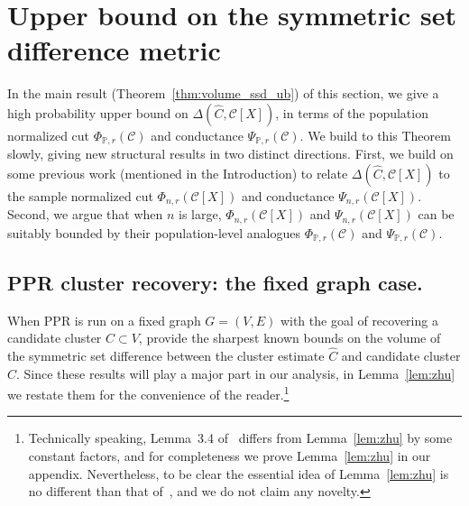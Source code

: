 \documentclass[11pt,twoside]{article}
\newcommand{\1}{\mathbf{1}}
\newcommand{\mc}[1]{\mathcal{#1}}
\newcommand{\Pbb}{\mathbb{P}}
\newcommand{\wh}[1]{\widehat{#1}}
\begin{document}
\section{Upper bound on the symmetric set difference metric}
\label{sec:ub_symmetric_set_difference}

In the main result (Theorem~\ref{thm:volume_ssd_ub}) of this section, we give a high probability upper bound on $\Delta(\wh{C}, \mc{C}[X])$, in terms of the population normalized cut $\Phi_{\Pbb,r}(\mc{C})$ and conductance $\Psi_{\Pbb,r}(\mc{C})$. We build to this Theorem slowly, giving new structural results in two distinct directions. First, we build on some previous work (mentioned in the Introduction) to relate $\Delta(\wh{C}, \mc{C}[X])$ to the sample normalized cut $\Phi_{n,r}(\mc{C}[X])$ and conductance $\Psi_{n,r}(\mc{C}[X])$. Second, we argue that when $n$ is large, $\Phi_{n,r}(\mc{C}[X])$ and $\Psi_{n,r}(\mc{C}[X])$ can be suitably bounded by their population-level analogues $\Phi_{\Pbb,r}(\mc{C})$ and $\Psi_{\Pbb,r}(\mc{C})$.

\subsection{PPR cluster recovery: the fixed graph case.}
\label{subsec:ppr_cluster_recovery_fixed_graph}
When PPR is run on a fixed graph $G = (V,E)$ with the goal of recovering a candidate cluster $C \subset V$, \cite{zhu2013} provide the sharpest known bounds on the volume of the symmetric set difference between the cluster estimate $\wh{C}$ and candidate cluster $C$. Since these results will play a major part in our analysis, in Lemma~\ref{lem:zhu} we restate them for the convenience of the reader.\footnote{Technically speaking, Lemma~3.4 of~\cite{zhu2013} differs from Lemma~\ref{lem:zhu} by some constant factors, and for completeness we prove Lemma~\ref{lem:zhu} in our appendix. Nevertheless, to be clear the essential idea of Lemma~\ref{lem:zhu} is no different than that of~\cite{zhu2013}, and we do not claim any novelty.}
\end{document}

